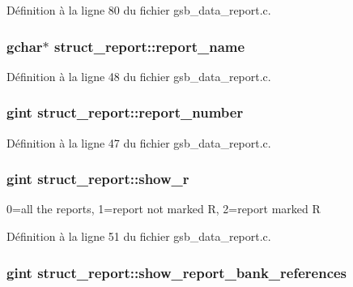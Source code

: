 Définition à la ligne 80 du fichier gsb\_\-data\_\-report.c.

\subsubsection[{report\_\-name}]{\setlength{\rightskip}{0pt plus 5cm}gchar$\ast$ {\bf struct\_\-report::report\_\-name}}\label{structstruct__report_ac19acba0828af84e9e0bc6cb894877a1}


Définition à la ligne 48 du fichier gsb\_\-data\_\-report.c.

\subsubsection[{report\_\-number}]{\setlength{\rightskip}{0pt plus 5cm}gint {\bf struct\_\-report::report\_\-number}}\label{structstruct__report_a41840aa5e3b777b24a907d48745a1bac}


Définition à la ligne 47 du fichier gsb\_\-data\_\-report.c.

\subsubsection[{show\_\-r}]{\setlength{\rightskip}{0pt plus 5cm}gint {\bf struct\_\-report::show\_\-r}}\label{structstruct__report_a74bb9fce5dc7ab646ba66af81b37c210}
0=all the reports, 1=report not marked R, 2=report marked R 

Définition à la ligne 51 du fichier gsb\_\-data\_\-report.c.

\subsubsection[{show\_\-report\_\-bank\_\-references}]{\setlength{\rightskip}{0pt plus 5cm}gint {\bf struct\_\-report::show\_\-report\_\-bank\_\-references}}\label{structstruct__report_a9db835ff05a8a634ca98aa0ef36074e1}


